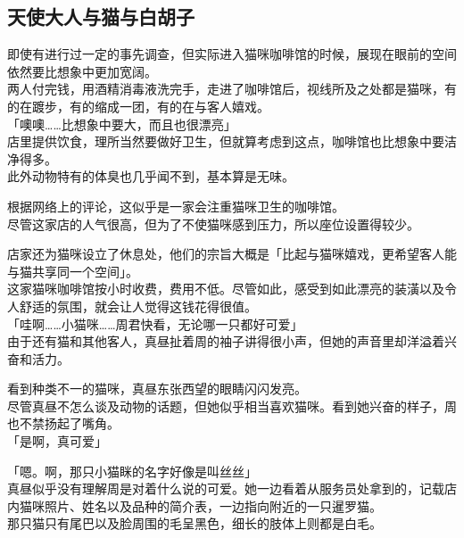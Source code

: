 \subsection{天使大人与猫与白胡子}

即使有进行过一定的事先调查，但实际进入猫咪咖啡馆的时候，展现在眼前的空间依然要比想象中更加宽阔。\\

两人付完钱，用酒精消毒液洗完手，走进了咖啡馆后，视线所及之处都是猫咪，有的在踱步，有的缩成一团，有的在与客人嬉戏。\\

「噢噢……比想象中要大，而且也很漂亮」\\

店里提供饮食，理所当然要做好卫生，但就算考虑到这点，咖啡馆也比想象中要洁净得多。\\

此外动物特有的体臭也几乎闻不到，基本算是无味。

根据网络上的评论，这似乎是一家会注重猫咪卫生的咖啡馆。\\

尽管这家店的人气很高，但为了不使猫咪感到压力，所以座位设置得较少。

店家还为猫咪设立了休息处，他们的宗旨大概是「比起与猫咪嬉戏，更希望客人能与猫共享同一个空间」。\\

这家猫咪咖啡馆按小时收费，费用不低。尽管如此，感受到如此漂亮的装潢以及令人舒适的氛围，就会让人觉得这钱花得很值。\\

「哇啊……小猫咪……周君快看，无论哪一只都好可爱」\\

由于还有猫和其他客人，真昼扯着周的袖子讲得很小声，但她的声音里却洋溢着兴奋和活力。

看到种类不一的猫咪，真昼东张西望的眼睛闪闪发亮。\\

尽管真昼不怎么谈及动物的话题，但她似乎相当喜欢猫咪。看到她兴奋的样子，周也不禁扬起了嘴角。\\

「是啊，真可爱」

「嗯。啊，那只小猫眯的名字好像是叫丝丝」\\

真昼似乎没有理解周是对着什么说的可爱。她一边看着从服务员处拿到的，记载店内猫咪照片、姓名以及品种的简介表，一边指向附近的一只暹罗猫。\\

那只猫只有尾巴以及脸周围的毛呈黑色，细长的肢体上则都是白毛。

